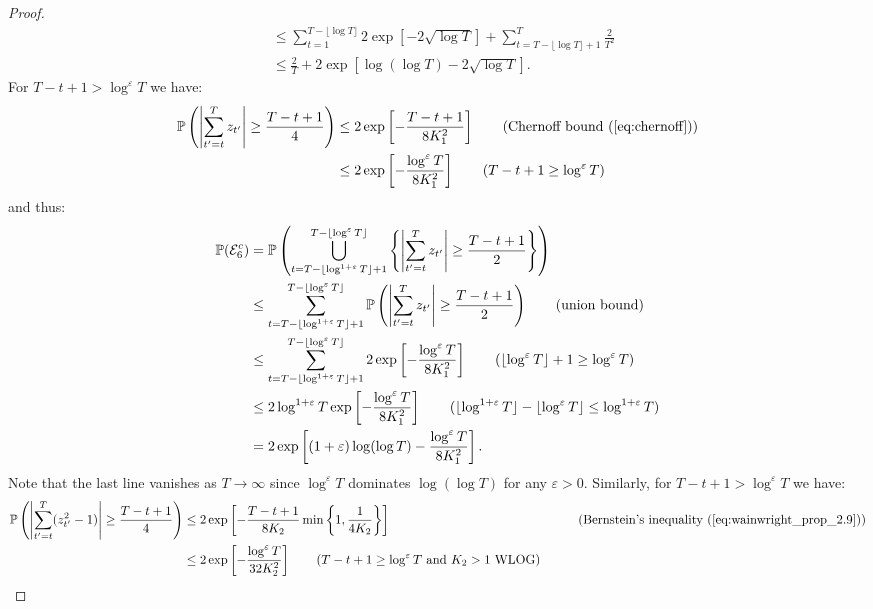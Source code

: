 \begin{proof}
\begin{align*}
    &\leq \sum_{t = 1}^{ T - \lfloor\log T\rfloor}  2\exp\left[-2\sqrt{\log T}\right] + \sum_{t = T - \lfloor \log T\rfloor +1}^T \frac{2}{T^2} \\
    &\leq \frac{2}{T} + 2\exp\left[\log(\log T)-2\sqrt{\log T}\right]. 
\end{align*}
\normalsize
For $T - t + 1 > \log^\varepsilon T$ we have: 
\begin{align*}
    \Pr\left(\left|\sum_{t'=t}^T z_{t'}\right| \geq \frac{T-t+1}{4}\right) &\leq 2\exp\left[-\frac{T-t+1}{8K^2_1}\right] \tag{Chernoff bound (\ref{eq:chernoff})} \\
    &\leq 2 \exp\left[-\frac{\log^\varepsilon T}{8K^2_1}\right] \tag{$T-t+1 \geq \log^\varepsilon T$}
\end{align*}
and thus:
\small
\begin{align*}
    \Pr(\mathcal{E}^c_6) &= \Pr\left(\bigcup_{t = T - \lfloor\log^{1+\varepsilon} T\rfloor + 1}^{T - \lfloor\log^{\varepsilon} T\rfloor} \left\{\left|\sum_{t'=t}^T z_{t'}\right| \geq \frac{T-t+1}{2}\right\} \right) \\
    &\leq \sum_{t = T - \lfloor\log^{1+\varepsilon} T\rfloor + 1}^{T - \lfloor\log^{\varepsilon} T\rfloor} \Pr\left(\left|\sum_{t'=t}^T z_{t'}\right| \geq \frac{T-t+1}{2}\right) \tag{union bound} \\
    &\leq \sum_{t = T - \lfloor\log^{1+\varepsilon} T\rfloor + 1}^{T - \lfloor\log^{\varepsilon} T\rfloor}  2 \exp\left[-\frac{\log^\varepsilon T}{8K^2_1}\right] \tag{$\lfloor\log^{\varepsilon} T\rfloor + 1 \geq \log^{\varepsilon} T$} \\
    &\leq  2 \log^{1+\varepsilon} T\exp\left[-\frac{\log^\varepsilon T}{8K^2_1}\right] \tag{$\lfloor\log^{1+\varepsilon} T\rfloor - \lfloor\log^{\varepsilon} T\rfloor  \leq \log^{1+\varepsilon} T$} \\
    &= 2 \exp\left[(1+\varepsilon)\log(\log T)-\frac{\log^\varepsilon T}{8K^2_1}\right]. 
\end{align*}
\normalsize
Note that the last line vanishes as $T \to \infty$ since $\log^\varepsilon T$ dominates $\log(\log T)$ for any $\varepsilon > 0$. Similarly, for $T - t + 1 > \log^\varepsilon T$ we have: 
\small
\begin{align*}
    \Pr\left(\left|\sum_{t'=t}^T (z^2_{t'}-1)\right| \geq \frac{T-t+1}{4}\right) &\leq 2\exp\left[-\frac{T-t+1}{8K_2}\min\left\{1, \frac{1}{4K_2}\right\}\right]& \tag{Bernstein's inequality (\ref{eq:wainwright_prop_2.9})} \\
    &\leq 2 \exp\left[-\frac{\log^\varepsilon T}{32K^2_2}\right] \tag{$T-t+1 \geq \log^\varepsilon T$ and $K_2 > 1$ WLOG}

\end{align*}
\end{proof}
